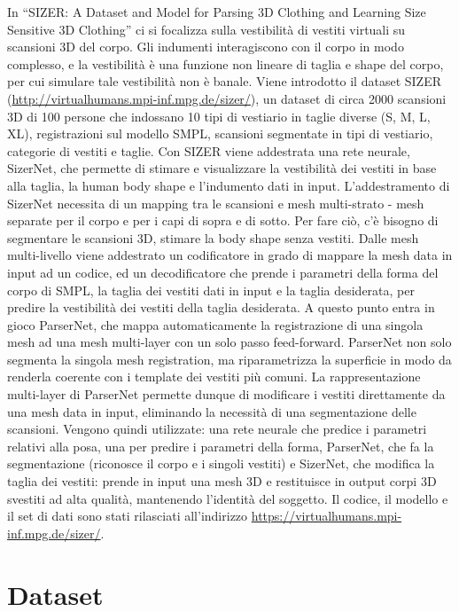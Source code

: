In “SIZER: A Dataset and Model for Parsing 3D Clothing and Learning Size Sensitive 3D Clothing” \cite{tiwari2020sizer} ci si focalizza sulla vestibilità di vestiti virtuali su scansioni 3D del corpo. Gli indumenti interagiscono con il corpo in modo complesso, e la vestibilità è una funzione non lineare di taglia e shape del corpo, per cui simulare tale vestibilità non è banale. Viene introdotto il dataset SIZER (\url{http://virtualhumans.mpi-inf.mpg.de/sizer/}), un dataset di circa 2000 scansioni 3D di 100 persone che indossano 10 tipi di vestiario in taglie diverse (S, M, L, XL), registrazioni sul modello SMPL, scansioni segmentate in tipi di vestiario, categorie di vestiti e taglie.
Con SIZER viene addestrata una rete neurale, SizerNet, che permette di stimare e visualizzare la vestibilità dei vestiti in base alla taglia, la human body shape e l’indumento dati in input. L’addestramento di SizerNet necessita di un mapping tra le scansioni e mesh multi-strato - mesh separate per il corpo e per i capi di sopra e di sotto. Per fare ciò, c’è bisogno di segmentare le scansioni 3D, stimare la body shape senza vestiti.
Dalle mesh multi-livello viene addestrato un codificatore in grado di mappare la mesh data in input ad un codice, ed un decodificatore che prende i parametri della forma del corpo di SMPL, la taglia dei vestiti dati in input e la taglia desiderata, per predire la vestibilità dei vestiti della taglia desiderata. A questo punto entra in gioco ParserNet, che mappa automaticamente la registrazione di una singola mesh ad una mesh multi-layer con un solo passo feed-forward. ParserNet non solo segmenta la singola mesh registration, ma riparametrizza la superficie in modo da renderla coerente con i template dei vestiti più comuni.
La rappresentazione multi-layer di ParserNet permette dunque di modificare i vestiti direttamente da una mesh data in input, eliminando la necessità di una segmentazione delle scansioni.
Vengono quindi utilizzate: una rete neurale che predice i parametri relativi alla posa, una per predire i parametri della forma, ParserNet, che fa la segmentazione (riconosce il corpo e i singoli vestiti) e SizerNet, che modifica la taglia dei vestiti: prende in input una mesh 3D e restituisce in output corpi 3D svestiti ad alta qualità, mantenendo l’identità del soggetto.
Il codice, il modello e il set di dati sono stati rilasciati all’indirizzo \url{https://virtualhumans.mpi-inf.mpg.de/sizer/}.

\section{Dataset}

